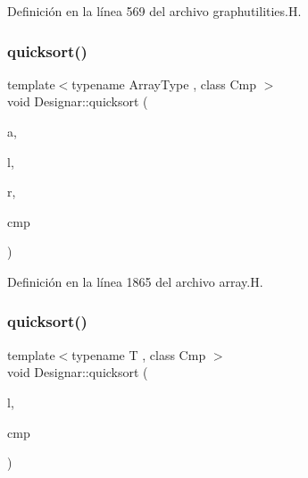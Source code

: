 Definición en la línea 569 del archivo graphutilities.\+H.

\mbox{\label{namespace_designar_a2e26fd2dcbb26e5ffc96a960dd4caa94}} 
\subsubsection{\texorpdfstring{quicksort()}{quicksort()}\hspace{0.1cm}{\footnotesize\ttfamily [1/14]}}
{\footnotesize\ttfamily template$<$typename Array\+Type , class Cmp $>$ \\
void Designar\+::quicksort (\begin{DoxyParamCaption}\item[{Array\+Type \&}]{a,  }\item[{\hyperlink{namespace_designar_a9d113d66a39e82b73727c72cd3a52f73}{lint\+\_\+t}}]{l,  }\item[{\hyperlink{namespace_designar_a9d113d66a39e82b73727c72cd3a52f73}{lint\+\_\+t}}]{r,  }\item[{Cmp \&}]{cmp }\end{DoxyParamCaption})}



Definición en la línea 1865 del archivo array.\+H.

\mbox{\label{namespace_designar_a7e1e90568197223b560306a01b496969}} 
\subsubsection{\texorpdfstring{quicksort()}{quicksort()}\hspace{0.1cm}{\footnotesize\ttfamily [2/14]}}
{\footnotesize\ttfamily template$<$typename T , class Cmp $>$ \\
void Designar\+::quicksort (\begin{DoxyParamCaption}\item[{\hyperlink{class_designar_1_1_node_s_l_list}{Node\+S\+L\+List}$<$ T $>$ \&}]{l,  }\item[{Cmp \&}]{cmp }\end{DoxyParamCaption})\hspace{0.3cm}{\ttfamily [inline]}}




